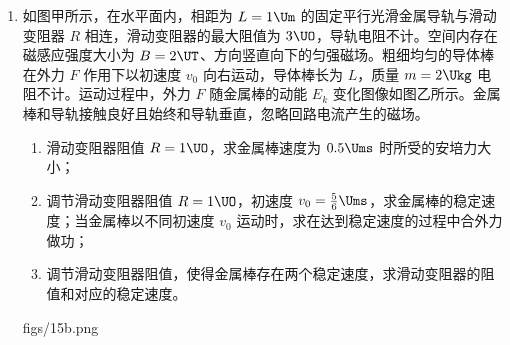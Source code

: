 \documentclass[\gkver]{gaokaozhenti}
\begin{document}
\begin{enumerate}
{$B$ 的绿灯窗口为 $t\in[30,60] \Us$

结合得到的 $a\in[0.375,0.75] \Umsq$，代入 $t_{B}$ 的表达式可得：

当 $a=0.375 \Umsq$ 时，$t_{B}=60 \Us$；当 $a=0.75 \Umsq$ 时，$t_{B}=50 \Us$。

即满足 $B$ 路口绿灯通行的要求，不存在闯红灯的情况。

因此加速度范围为 $0.375 \Umsq\leq a\leq0.75 \Umsq$
}

\gknewpage
\item
如图甲所示，在水平面内，相距为 $L=1 \Um$ 的固定平行光滑金属导轨与滑动变阻器 $R$ 相连，滑动变阻器的最大阻值为 $3 \UO$，导轨电阻不计。空间内存在磁感应强度大小为 $B=2 \UT$、方向竖直向下的匀强磁场。粗细均匀的导体棒在外力 $F$ 作用下以初速度 $v_{0}$ 向右运动，导体棒长为 $L$，质量 $m=2 \Ukg$ 电阻不计。运动过程中，外力 $F$ 随金属棒的动能 $E_{k}$ 变化图像如图乙所示。金属棒和导轨接触良好且始终和导轨垂直，忽略回路电流产生的磁场。
\begin{enumerate}
	\item
	滑动变阻器阻值 $R=1 \UO$，求金属棒速度为 $0.5 \Ums$ 时所受的安培力大小；
	\item
	调节滑动变阻器阻值 $R=1 \UO$，初速度 $v_{0}=\frac{5}{6} \Ums$，求金属棒的稳定速度；当金属棒以不同初速度 $v_{0}$ 运动时，求在达到稳定速度的过程中合外力做功；
	\item
	调节滑动变阻器阻值，使得金属棒存在两个稳定速度，求滑动变阻器的阻值和对应的稳定速度。
\end{enumerate}
{figs/15b.png}

\end{enumerate}
\end{document}
